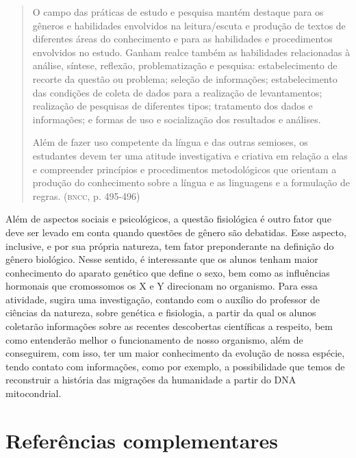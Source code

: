 \documentclass[12pt]{extarticle}
\begin{document}
\begin{quote}
O campo das práticas de estudo e pesquisa mantém destaque para os
gêneros e habilidades envolvidos na leitura/escuta e produção de textos
de diferentes áreas do conhecimento e para as habilidades e
procedimentos envolvidos no estudo. Ganham realce também as habilidades
relacionadas à análise, síntese, reflexão, problematização e pesquisa:
estabelecimento de recorte da questão ou problema; seleção de
informações; estabelecimento das condições de coleta de dados para a
realização de levantamentos; realização de pesquisas de diferentes
tipos; tratamento dos dados e informações; e formas de uso e
socialização dos resultados e análises.

Além de fazer uso competente da língua e das outras semioses, os
estudantes devem ter uma atitude investigativa e criativa em relação a
elas e compreender princípios e procedimentos metodológicos que orientam
a produção do conhecimento sobre a língua e as linguagens e a formulação
de regras. (\textsc{bncc}, p. 495-496)
\end{quote}

Além de aspectos sociais e psicológicos, a questão fisiológica é outro
fator que deve ser levado em conta quando questões de gênero são
debatidas. Esse aspecto, inclusive, e por sua própria natureza, tem
fator preponderante na definição do gênero biológico. Nesse sentido, é
interessante que os alunos tenham maior conhecimento do aparato
genético que define o sexo, bem como as influências hormonais que
cromossomos os X e Y direcionam no organismo. Para essa atividade,
sugira uma investigação, contando com o auxílio do professor de
ciências da natureza, sobre genética e fisiologia, a partir da qual os
alunos coletarão informações sobre as recentes descobertas científicas
a respeito, bem como entenderão melhor o funcionamento de nosso
organismo, além de conseguirem, com isso, ter um maior conhecimento da
evolução de nossa espécie, tendo contato com informações, como por
exemplo, a possibilidade que temos de reconstruir a história das
migrações da humanidade a partir do DNA mitocondrial.

\section{Referências complementares}
\end{document}
